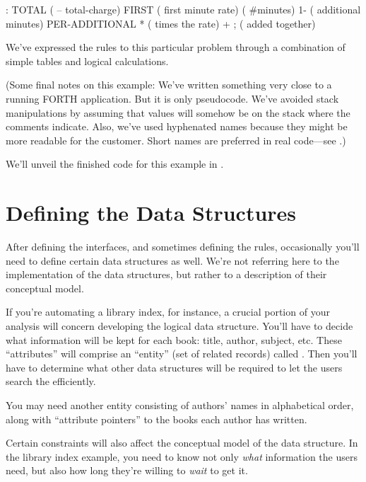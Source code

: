 \begin{Code}
: TOTAL   ( -- total-charge)
   FIRST                        ( first minute rate)
   ( #minutes) 1-               ( additional minutes)
      PER-ADDITIONAL *          ( times the rate)
   +  ;                         ( added together)
\end{Code}
We've expressed the rules to this particular problem through a
combination of simple tables and logical calculations.

(Some final notes on this example: We've written something very close
to a running FORTH application. But it is only pseudocode. We've
avoided stack manipulations by assuming that values will somehow be on
the stack where the comments indicate. Also, we've used hyphenated
names because they might be more readable for the customer. Short
names are preferred in real code---see .)

We'll unveil the finished code for this example in .

\section{Defining the Data Structures}

After defining the interfaces, and sometimes defining the rules,
occasionally you'll need to define certain data structures as well.
We're not referring here to the implementation of the data structures,
but rather to a description of their conceptual model.

If you're automating a library index, for instance, a crucial portion
of your analysis will concern developing the logical data structure.
You'll have to decide what information will be kept for each book:
title, author, subject, etc. These ``attributes'' will comprise an
``entity'' (set of related records) called . Then you'll
have to determine what other data structures will be required to let
the users search the  efficiently.




You may need another entity consisting of authors' names in
alphabetical order, along with ``attribute pointers'' to the books
each author has written.

Certain constraints will also affect the conceptual model of the data
structure. In the library index example, you need to know not only
\emph{what} information the users need, but also how long they're
willing to \emph{wait} to get it.

